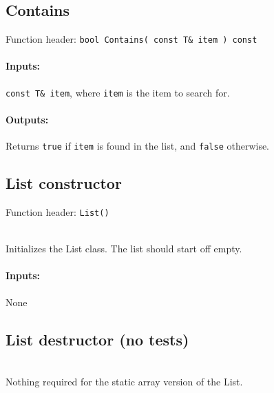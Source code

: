     \begin{framed}
    \subsection{Contains}

    Function header: \texttt{bool    Contains( const T\& item ) const}

    \paragraph{Inputs:}
        \texttt{const T\& item}, where \texttt{item} is the item to search for.

    \paragraph{Outputs:}
        Returns \texttt{true} if \texttt{item} is found in the list, and \texttt{false} otherwise.

    \end{framed}
    
    \begin{framed}
    \subsection{List constructor}

    Function header: \texttt{List()}

    ~\\ Initializes the List class. The list should start off empty.

    \paragraph{Inputs:}
        None

    \end{framed}
    
    \begin{framed}
    \subsection{List destructor (no tests)}

    ~\\ Nothing required for the static array version of the List.

    \end{framed}

